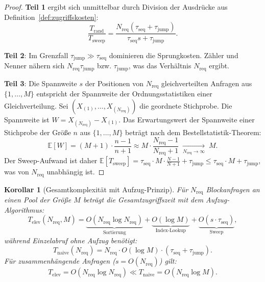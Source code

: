 ﻿\documentclass[a4paper,12pt]{article}
\theoremstyle{definition}
\theoremstyle{plain}
\newtheorem{korollar}{Korollar}[section]
\begin{document}
\begin{proof}
  \textbf{Teil 1} ergibt sich unmittelbar durch Division der Ausdrücke
  aus Definition~\ref{def:zugriffskosten}:
  \[
    \frac{T_{\mathrm{rand}}}{T_{\mathrm{sweep}}}
    = \frac{N_{\mathrm{req}} (\tau_{\mathrm{seq}} + \tau_{\mathrm{jump}})}
           {\tau_{\mathrm{seq}} s + \tau_{\mathrm{jump}}}.
  \]

  \textbf{Teil 2}: Im Grenzfall $\tau_{\mathrm{jump}} \gg \tau_{\mathrm{seq}}$
  dominieren die Sprungkosten.  Zähler und Nenner nähern sich
  $N_{\mathrm{req}} \tau_{\mathrm{jump}}$ bzw. $\tau_{\mathrm{jump}}$,
  was das Verhältnis $N_{\mathrm{req}}$ ergibt.

  \textbf{Teil 3}: Die Spannweite $s$ der Positionen von
  $N_{\mathrm{req}}$ gleichverteilten Anfragen aus $\{1,\ldots,M\}$
  entspricht der Spannweite der Ordnungsstatistiken einer
  Gleichverteilung.  Sei $(X_{(1)}, \ldots, X_{(N_{\mathrm{req}})})$ die
  geordnete Stichprobe.  Die Spannweite ist
  $W = X_{(N_{\mathrm{req}})} - X_{(1)}$.  Das Erwartungswert der
  Spannweite einer Stichprobe der Größe $n$ aus $\{1,\ldots,M\}$ beträgt
  nach dem Bestellstatistik-Theorem:
  \[
    \mathbb{E}[W]
    = (M+1)\cdot\frac{n-1}{n+1}
    \approx M \cdot \frac{N_{\mathrm{req}}-1}{N_{\mathrm{req}}+1}
    \;\underset{N_{\mathrm{req}}\to\infty}{\longrightarrow}\; M.
  \]
  Der Sweep-Aufwand ist daher
  $\mathbb{E}[T_{\mathrm{sweep}}]
     = \tau_{\mathrm{seq}} \cdot M \cdot \frac{N-1}{N+1} + \tau_{\mathrm{jump}}
     \le \tau_{\mathrm{seq}} \cdot M + \tau_{\mathrm{jump}}$,
  was von $N_{\mathrm{req}}$ unabhängig ist. 
\end{proof}

\begin{korollar}[Gesamtkomplexität mit Aufzug-Prinzip]
\label{kor:elevator_total}
  Für $N_{\mathrm{req}}$ Blockanfragen an einen Pool der Größe $M$ beträgt
  die Gesamtzugriffszeit mit dem Aufzug-Algorithmus:
  \[
    T_{\mathrm{elev}}(N_{\mathrm{req}}, M)
    = \underbrace{O(N_{\mathrm{req}} \log N_{\mathrm{req}})}_{\text{Sortierung}}
    + \underbrace{O(\log M)}_{\text{Index-Lookup}}
    + \underbrace{O(s \cdot \tau_{\mathrm{seq}})}_{\text{Sweep}},
  \]
  während Einzelabruf ohne Aufzug benötigt:
  \[
    T_{\mathrm{naive}}(N_{\mathrm{req}})
    = N_{\mathrm{req}} \cdot O(\log M) \cdot (\tau_{\mathrm{seq}} + \tau_{\mathrm{jump}}).
  \]
  Für zusammenhängende Anfragen ($s = O(N_{\mathrm{req}})$) gilt:
  \[
    T_{\mathrm{elev}} = O(N_{\mathrm{req}} \log N_{\mathrm{req}})
    \ll T_{\mathrm{naive}} = O(N_{\mathrm{req}} \log M).
  \]
\end{korollar}
\end{document}
